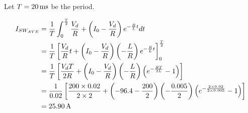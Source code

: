 \subsection{}


Let $T=\unit[20]{ms}$ be the period.

\begin{align*}
I_{SW_{AVE}} & = \frac{1}{T} \int_0^{\frac{T}{2}} \frac{V_d}{R} + \left(I_0-\frac{V_d}{R}\right) e^{-\frac{R}{L}t} dt \\
& = \frac{1}{T} \left[\frac{V_d}{R}t + \left(I_0-\frac{V_d}{R}\right)\left(-\frac{L}{R}\right) e^{-\frac{R}{L}t} \right]_0^{\frac{T}{2}}\\
& = \frac{1}{T} \left[\frac{V_dT}{2R} + \left(I_0-\frac{V_d}{R}\right)\left(-\frac{L}{R}\right) \left(e^{-\frac{RT}{2L}}-1\right) \right]\\
& = \frac{1}{0.02} \left[\frac{200\times 0.02}{2\times 2} + \left(-96.4-\frac{200}{2}\right)\left(-\frac{0.005}{2}\right) \left(e^{-\frac{2\times0.02}{2\times 0.005}}-1\right) \right]\\
& = \unit[25.90]{A}
\end{align*}